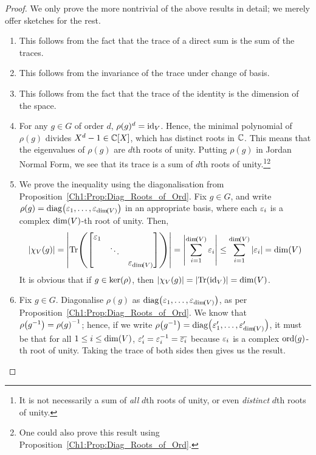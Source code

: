\begin{proof}
    We only prove the more nontrivial of the above results in detail; we merely offer sketches for the rest.
    \begin{enumerate}[noitemsep]
        \item This follows from the fact that the trace of a direct sum is the sum of the traces.
        \item This follows from the invariance of the trace under change of basis.
        \item This follows from the fact that the trace of the identity is the dimension of the space.
        \item For any $g \in G$ of order $d$, $\rho(g)^d = \operatorname{id}_V$. Hence, the minimal polynomial of $\rho(g)$ divides $X^d - 1 \in \mathbb{C}[X]$, which has distinct roots in $\mathbb{C}$. This means that the eigenvalues of $\rho(g)$ are $d$th roots of unity. Putting $\rho(g)$ in Jordan Normal Form, we see that its trace is a sum of $d$th roots of unity.\footnote{It is not necessarily a sum of \textit{all} $d$th roots of unity, or even \textit{distinct} $d$th roots of unity.}\footnote{One could also prove this result using Proposition~\ref{Ch1:Prop:Diag_Roots_of_Ord}.}
        \item We prove the inequality using the diagonalisation from Proposition~\ref{Ch1:Prop:Diag_Roots_of_Ord}. Fix $g \in G$, and write $\rho(g) = \operatorname{diag}\!\left( \varepsilon_1, \ldots, \varepsilon_{\dim\!\left( V \right)} \right)$ in an appropriate basis, where each $\varepsilon_i$ is a complex $\dim\!\left( V \right)$-th root of unity. Then,
        \begin{align*}
            \left\lvert \chi_V(g) \right\rvert = \left\lvert \operatorname{Tr}\!\left( \begin{bmatrix}
                \varepsilon_1 & & \\ & \ddots & \\ & & \varepsilon_{\dim\!\left( V \right)}
            \end{bmatrix} \right) \right\rvert = \left\lvert \sum_{i=1}^{\dim\!\left( V \right)} \varepsilon_i \right\rvert \leq \sum_{i=1}^{\dim\!\left( V \right)} \left\lvert \varepsilon_i \right\rvert = \dim\!\left( V \right)
        \end{align*}
        It is obvious that if $g \in \operatorname{ker}\!\left( \rho \right)$, then $\left\lvert \chi_V(g) \right\rvert = \left\lvert \operatorname{Tr}\!\left( \operatorname{id}_V \right) \right\rvert = \dim\!\left( V \right)$.
        \item Fix $g \in G$. Diagonalise $\rho(g)$ as $\operatorname{diag}\!\left( \varepsilon_1, \ldots, \varepsilon_{\dim\!\left( V \right)} \right)$, as per Proposition~\ref{Ch1:Prop:Diag_Roots_of_Ord}. We know that $\rho\!\left( g^{-1} \right) = \rho\!\left( g \right)^{-1}$; hence, if we write $\rho\!\left( g^{-1} \right) = \operatorname{diag}\!\left( \varepsilon'_1, \ldots, \varepsilon'_{\dim\!\left( V \right)} \right)$, it must be that for all $1 \leq i \leq \dim\!\left( V \right)$, $\varepsilon'_i = \varepsilon_i^{-1} = \overline{\varepsilon_i}$ because $\varepsilon_i$ is a complex $\operatorname{ord}\!\left( g \right)$-th root of unity. Taking the trace of both sides then gives us the result.

\end{enumerate}
\end{proof}
